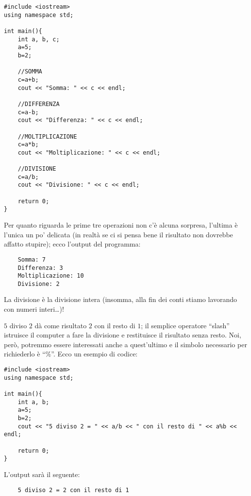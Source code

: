 	\begin{lstlisting}
#include <iostream>
using namespace std;

int main(){
	int a, b, c;
	a=5;
	b=2;
	
	//SOMMA
	c=a+b;
	cout << "Somma: " << c << endl;	
	
	//DIFFERENZA
	c=a-b;
	cout << "Differenza: " << c << endl;	
	
	//MOLTIPLICAZIONE
	c=a*b;
	cout << "Moltiplicazione: " << c << endl;	
		
	//DIVISIONE
	c=a/b;
	cout << "Divisione: " << c << endl;	
	
	return 0;
}
	\end{lstlisting}
	Per quanto riguarda le prime tre operazioni non c'è alcuna sorpresa, l'ultima è l'unica un po' delicata (in realtà se ci si pensa bene il risultato non dovrebbe affatto stupire); ecco l'output del programma:
	\begin{shaded}
		\begin{minipage}{\textwidth}
			\begin{verbatim}
	Somma: 7
	Differenza: 3
	Moltiplicazione: 10
	Divisione: 2
			\end{verbatim}%
		\end{minipage}
	\end{shaded}
	La divisione è la divisione intera (insomma, alla fin dei conti stiamo lavorando con numeri interi\ldots)!

	$5$ diviso $2$ dà come risultato $2$ con il resto di $1$; il semplice operatore ``slash'' istruisce il computer a fare la divisione e restituisce il risultato senza resto. Noi, però, potremmo essere interessati anche a quest'ultimo e il simbolo necessario per richiederlo è ``\%''. Ecco un esempio di codice:
	
	\begin{lstlisting}
#include <iostream>
using namespace std;
		
int main(){
	int a, b;
	a=5;
	b=2;
	cout << "5 diviso 2 = " << a/b << " con il resto di " << a%b << endl;
	
	return 0;
}
	\end{lstlisting}
	
	L'output sarà il seguente:
	\begin{shaded}
		\begin{minipage}{\textwidth}
			\begin{verbatim}
	5 diviso 2 = 2 con il resto di 1
	\end{verbatim}%
\end{minipage}
\end{shaded}
	

